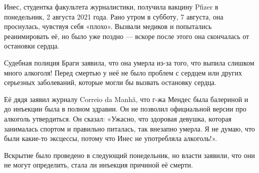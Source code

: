 Инес, студентка факультета журналистики, получила вакцину Pfizer в понедельник,
2 августа 2021 года. Рано утром в субботу, 7 августа, она проснулась, чувствуя
себя «плохо». Вызвали медиков и попытались реанимировать её, но было уже поздно
— вскоре после этого она скончалась от остановки сердца.

Судебная полиция Браги заявила, что она умерла из-за того, что выпила слишком
много алкоголя! Перед смертью у неё не было проблем с сердцем или других
серьезных заболеваний, которые могли бы вызвать остановку сердца.

Её дядя заявил журналу Correio da Manhã, что г-жа Мендес была балериной и до
инъекции была в полном здравии. Он не позволил официальной версии про алкоголь
утвердиться. Он сказал: «Ужасно, что здоровая девушка, которая занималась
спортом и правильно питалась, так внезапно умерла. Я не думаю, что были какие-то
эксцессы, потому что Инес не употребляла алкоголь!».

Вскрытие было проведено в следующий понедельник, но власти заявили, что они не
могут определить, стала ли инъекция причиной её смерти.
